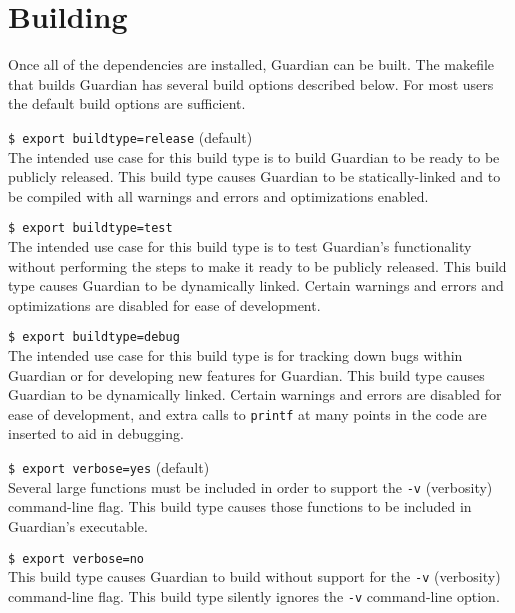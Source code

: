 
\section{Building}
{
	Once all of the dependencies are installed, Guardian can be built. The
	makefile that builds Guardian has several build options described below.
	For most users the default build options are sufficient.
	
	\begin{itemize}
	{
		\item[] {\texttt{\$ export buildtype=release} (default)}\\
		{
			The intended use case for this build type is to build Guardian to be
			ready to be publicly released.
			This build type causes Guardian to be statically-linked and to be
			compiled with all warnings and errors and optimizations enabled.
		}
		
		\item[] {\texttt{\$ export buildtype=test}}\\
		{
			The intended use case for this build type is to test Guardian's
			functionality without
			performing the steps to make it ready to be publicly released.
			This build type causes Guardian to be dynamically linked.
			Certain warnings and errors and optimizations are disabled for
			ease of development.
		}
		
		\item[] {\texttt{\$ export buildtype=debug}}\\
		{
			The intended use case for this build type is for tracking down
			bugs within Guardian or for developing new features for Guardian.
			This build type causes Guardian to be dynamically linked. Certain
			warnings and errors
			are disabled for ease of development, and extra calls to
			\texttt{printf}
			at many points in the code are inserted to aid in debugging.
		}
		
		\item[] {\texttt{\$ export verbose=yes} (default)}\\
		{
			Several large functions must be included in order to support the
			\texttt{-v} (verbosity) command-line flag. This build
			type causes those
			functions to be included in Guardian's executable.
		}
		
		\item[] {\texttt{\$ export verbose=no}}\\
		{
			This build type causes Guardian to build without support for the
			\texttt{-v} (verbosity) command-line flag. This build type
			silently ignores the \texttt{-v} command-line option.
		}
		
}
\end{itemize}}
